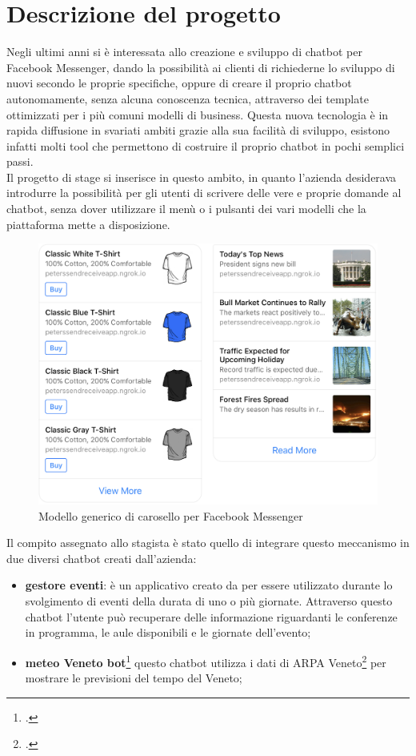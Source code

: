 \section{Descrizione del progetto}
Negli ultimi anni \azienda{} si è interessata allo creazione e sviluppo di \gls{chatbot} per Facebook Messenger, dando la possibilità ai clienti di richiederne lo sviluppo di nuovi secondo le proprie specifiche, oppure di creare il proprio \gls{chatbot} autonomamente, senza alcuna conoscenza tecnica, attraverso dei template ottimizzati per i più comuni modelli di business. Questa nuova tecnologia è in rapida diffusione in svariati ambiti grazie alla sua facilità di sviluppo, esistono infatti molti tool che permettono di costruire il proprio \gls{chatbot} in pochi semplici passi.\\
Il progetto di stage si inserisce in questo ambito, in quanto l'azienda desiderava introdurre la possibilità per gli utenti di scrivere delle vere e proprie domande al \gls{chatbot}, senza dover utilizzare il menù o i pulsanti dei vari modelli che la piattaforma mette a disposizione.
\begin{figure}[h]
	\centering
	\includegraphics[scale=0.2]{../Immagini/modello_lista.png}
	\caption{Modello generico di carosello per Facebook Messenger}
\end{figure}
\newpage
Il compito assegnato allo stagista è stato quello di integrare questo meccanismo in due diversi \gls{chatbot} creati dall'azienda:
\begin{itemize}
	\item \textbf{gestore eventi}: è un applicativo creato da \azienda{} per essere utilizzato durante lo svolgimento di eventi della durata di uno o più giornate. Attraverso questo \gls{chatbot} l'utente può recuperare delle informazione riguardanti le conferenze in programma, le aule disponibili e le giornate dell'evento;
	\item \textbf{meteo Veneto bot}\footcite{meteo} questo \gls{chatbot} utilizza i dati di ARPA Veneto\footcite{arpav} per mostrare le previsioni del tempo del Veneto;
\end{itemize}
